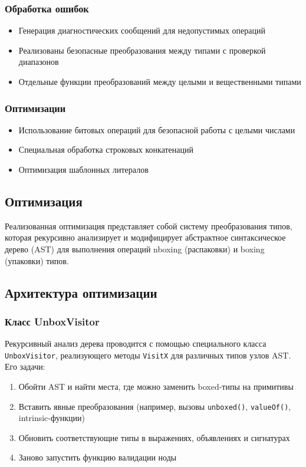 \subsubsection*{Обработка ошибок}
\begin{itemize}[label={--}]
    \item Генерация диагностических сообщений для недопустимых операций
    \item Реализованы безопасные преобразования между типами с проверкой диапазонов
    \item Отдельные функции преобразований между целыми и вещественными типами
\end{itemize}

\subsubsection*{Оптимизации}
\begin{itemize}[label={--}]
    \item Использование битовых операций для безопасной работы с целыми числами
    \item Специальная обработка строковых конкатенаций
    \item Оптимизация шаблонных литералов
\end{itemize}

\subsection{Оптимизация}


Реализованная оптимизация представляет собой систему преобразования типов, которая рекурсивно анализирует и модифицирует абстрактное синтаксическое дерево (AST) для выполнения операций nboxing (распаковки) и boxing (упаковки) типов.

\subsection*{Архитектура оптимизации}

\subsubsection{Класс UnboxVisitor}
Рекурсивный анализ дерева проводится с помощью специального класса \texttt{UnboxVisitor}, реализующего методы \texttt{VisitX} для различных типов узлов AST. Его задачи:
\begin{enumerate}
    \item Обойти AST и найти места, где можно заменить boxed-типы на примитивы
    \item Вставить явные преобразования (например, вызовы \texttt{unboxed()}, \texttt{valueOf()}, intrinsic-функции)
    \item Обновить соответствующие типы в выражениях, объявлениях и сигнатурах
    \item Заново запустить функцию валидации ноды
\end{enumerate}


